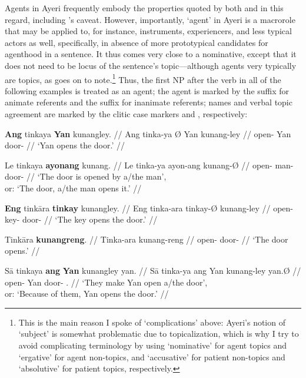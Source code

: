 Agents in Ayeri frequently embody the properties quoted by both
\citet{fillmore1968} and \citet{payne1997} in this regard, including 
\citet{fillmore1968}'s caveat. However, importantly, `agent' in Ayeri is 
a macrorole that may be applied to, for instance, instruments, experiencers,
and less typical actors as well, specifically, in absence of more prototypical
candidates for agenthood in a sentence. It thus comes very close to a
nominative, except that it does not need to be locus of the sentence's
topic---although agents very typically are topics, as
\citet[151]{payne1997} goes on to note.\footnote{This is the main reason I 
spoke of `complications' above: Ayeri's notion of `subject' is somewhat
problematic due to topicalization, which is why I try to avoid complicating
terminology by using `nominative' for agent topics and `ergative' for agent
non-topics, and `accusative' for patient non-topics and `absolutive' for
patient topics, respectively.} Thus, the first NP after the verb in all of the
following examples is treated as an agent; the agent is marked by the suffix
 for animate referents and the suffix  for 
inanimate referents; names and verbal topic agreement are marked by the clitic
case markers  and , respectively:

\pex
\a\begingl
	\gla \textbf{Ang} tinkaya {} \textbf{Yan} kunangley. //
	\glb Ang tinka-ya Ø Yan kunang-ley //
	\glc \AgtT{} open-\TsgM{} \Top{} Yan door-\PargI{} //
	\glft `Yan opens the door.' //
\endgl

\a\begingl
	\gla Le tinkaya \textbf{ayonang} kunang. //
	\glb Le tinka-ya ayon-ang kunang-Ø //
	\glc \PatT{} open-\TsgM{} man-\Aarg{} door-\Top{} //
	\glft `The door is opened by a/the man',\\
		or: `The door, a/the man opens it.' //
\endgl

\a\begingl
	\gla \textbf{Eng} tinkāra \textbf{tinkay} kunangley. //
	\glb Eng tinka-ara tinkay-Ø kunang-ley //
	\glc \AgtTI{} open-\TsgI{} key-\Top{} door-\PargI{} //
	\glft `The key opens the door.' //
\endgl

\a\begingl
	\gla Tinkāra \textbf{kunangreng}. //
	\glb Tinka-ara kunang-reng //
	\glc open-\TsgI{} door-\AargI{} //
	\glft `The door opens.' //
\endgl

\a\begingl
	\gla Sā tinkaya \textbf{ang} \textbf{Yan} kunangley yan. //
	\glb Sā tinka-ya ang Yan kunang-ley yan.Ø //
	\glc \CauT{} open-\TsgM{} \Aarg{} Yan door-\PargI{} \TsgM{}.\Top{} //
	\glft `They make Yan open a/the door',\\
		or: `Because of them, Yan opens the door.' //
\endgl

